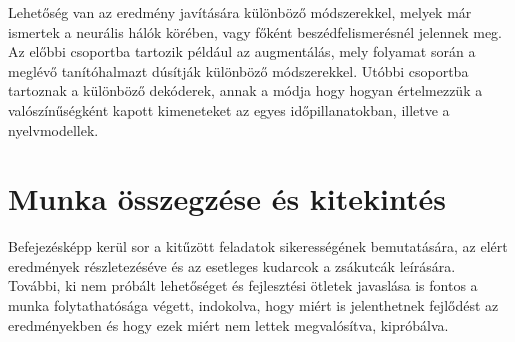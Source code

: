 Lehetőség van az eredmény javítására különböző módszerekkel, melyek már ismertek a neurális hálók körében, vagy főként beszédfelismerésnél jelennek meg. Az előbbi csoportba tartozik például az augmentálás, mely folyamat során a meglévő tanítóhalmazt dúsítják különböző módszerekkel. Utóbbi csoportba tartoznak a különböző dekóderek, annak a módja hogy hogyan értelmezzük a valószínűségként kapott kimeneteket az egyes időpillanatokban, illetve a nyelvmodellek.

\section{Munka összegzése és kitekintés}

Befejezésképp kerül sor a kitűzött feladatok sikerességének bemutatására, az elért eredmények részletezéséve és az esetleges kudarcok a zsákutcák leírására. További, ki nem próbált lehetőséget és fejlesztési ötletek javaslása is fontos a munka folytathatósága végett, indokolva, hogy miért is jelenthetnek fejlődést az eredményekben és hogy ezek miért nem lettek megvalósítva, kipróbálva.